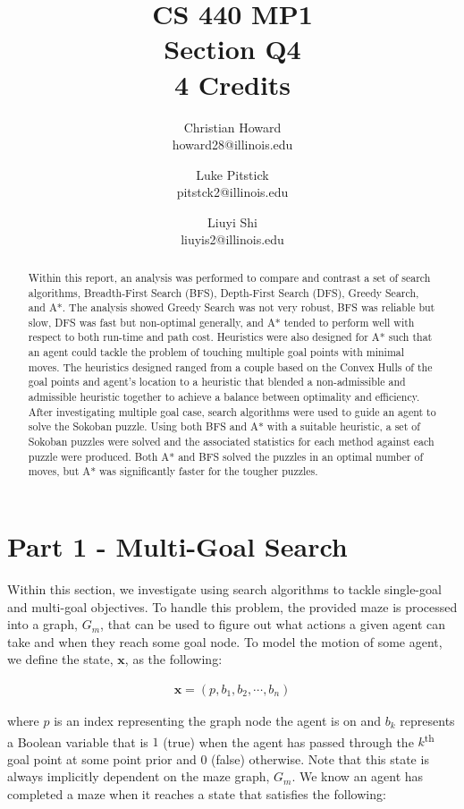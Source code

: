 \documentclass{article}[12pt]
\title{CS 440 MP1 \\ Section Q4 \\ 4 Credits}
\author{
Christian Howard \\ howard28@illinois.edu
\and
Luke Pitstick \\ pitstck2@illinois.edu
\and
Liuyi Shi \\ liuyis2@illinois.edu
}
\date{} %
\begin{document}
   
   \maketitle
   \begin{abstract}
   Within this report, an analysis was performed to compare and contrast a set of search algorithms, Breadth-First Search (BFS), Depth-First Search (DFS), Greedy Search, and A*. The analysis showed Greedy Search was not very robust, BFS was reliable but slow, DFS was fast but non-optimal generally, and A* tended to perform well with respect to both run-time and path cost. Heuristics were also designed for A* such that an agent could tackle the problem of touching multiple goal points with minimal moves. The heuristics designed ranged from a couple based on the Convex Hulls of the goal points and agent's location to a heuristic that blended a non-admissible and admissible heuristic together to achieve a balance between optimality and efficiency. After investigating multiple goal case, search algorithms were used to guide an agent to solve the Sokoban puzzle. Using both BFS and A* with a suitable heuristic, a set of Sokoban puzzles were solved and the associated statistics for each method against each puzzle were produced. Both A* and BFS solved the puzzles in an optimal number of moves, but A* was significantly faster for the tougher puzzles.
   \end{abstract}
   \newpage
   
   \tableofcontents
   \newpage
   
   \section{Part 1 - Multi-Goal Search}
   Within this section, we investigate using search algorithms to tackle single-goal and multi-goal objectives. To handle this problem, the provided maze is processed into a graph, $G_m$, that can be used to figure out what actions a given agent can take and when they reach some goal node. To model the motion of some agent, we define the state, $\boldsymbol{x}$, as the following:  
   
   \begin{align*}
   \boldsymbol{x} = \left( p, b_1, b_2, \cdots, b_n \right)
   \end{align*}
   
   where $p$ is an index representing the graph node the agent is on and $b_k$ represents a Boolean variable that is $1$ (true) when the agent has passed through the $k$\textsuperscript{th} goal point at some point prior and $0$ (false) otherwise. Note that this state is always implicitly dependent on the maze graph, $G_m$. We know an agent has completed a maze when it reaches a state that satisfies the following:
   
\end{document}
